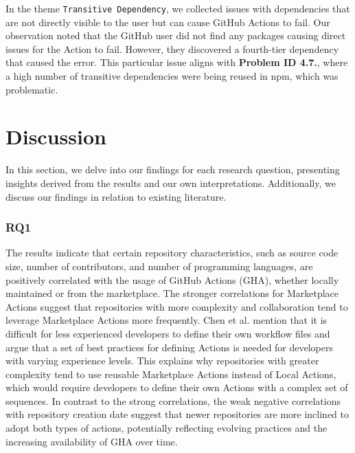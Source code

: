 \documentclass[conference]{IEEEtran}
\begin{document}
	In the theme \texttt{Transitive Dependency}, we collected issues with dependencies that are not directly visible to the user but can cause GitHub Actions to fail. Our observation noted that the GitHub user did not find any packages causing direct issues for the Action to fail. However, they discovered a fourth-tier dependency that caused the error. This particular issue aligns with \textbf{Problem ID 4.7.}, where a high number of transitive dependencies were being reused in npm, which was problematic\cite{hugomg22024}.
\section{Discussion}

	In this section, we delve into our findings for each research question, presenting insights derived from the results and our own interpretations. Additionally, we discuss our findings in relation to existing literature. \\

\subsubsection{\textbf{RQ1}} The results indicate that certain repository characteristics, such as source code size, number of contributors, and number of programming languages, are positively correlated with the usage of GitHub Actions (GHA), whether locally maintained or from the marketplace. The stronger correlations for Marketplace Actions suggest that repositories with more complexity and collaboration tend to leverage Marketplace Actions more frequently. Chen et al. \cite{chen2021supercharge} mention that it is difficult for less experienced developers to define their own workflow files and argue that a set of best practices for defining Actions is needed for developers with varying experience levels. This explains why repositories with greater complexity tend to use reusable Marketplace Actions instead of Local Actions, which would require developers to define their own Actions with a complex set of sequences. In contrast to the strong correlations, the weak negative correlations with repository creation date suggest that newer repositories are more inclined to adopt both types of actions, potentially reflecting evolving practices and the increasing availability of GHA over time.
\end{document}

